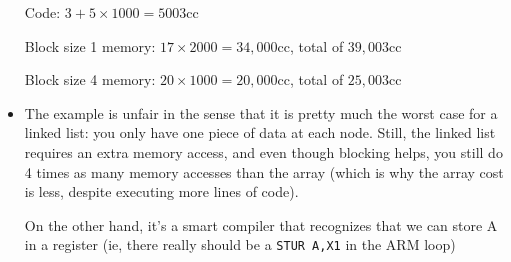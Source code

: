 \begin{frame}[fragile]
\begin{itemize}
	Code: $3+5\times1000=5003$cc

	Block size 1 memory: $17\times2000=34,000$cc, total of $39,003$cc

	Block size 4 memory: $20\times1000=20,000$cc, total of $25,003$cc

	\item The example is unfair in the sense that it is pretty much the
		worst case for a linked list: you only have one piece of
		data at each node.  Still, the linked list requires an
		extra memory access, and even though blocking helps, you
		still do 4 times as many memory accesses than the array
		(which is why the array cost is less, despite executing
		more lines of code).

		On the other hand, it's a smart compiler that recognizes
		that we can store A in a register (ie, there really should be a 
		\texttt{STUR A,X1} in the ARM loop)
\end{itemize}
\fi\ENotes
\end{frame}

